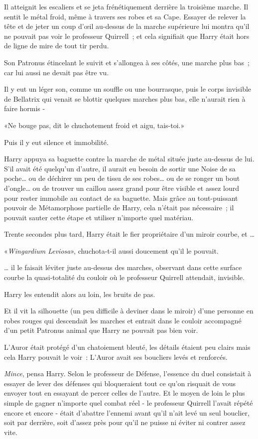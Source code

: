 Il atteignit les escaliers et se jeta frénétiquement derrière la troisième marche. Il sentit le métal froid, même à travers ses robes et sa Cape. Essayer de relever la tête et de jeter un coup d'œil au-dessus de la marche supérieure lui montra qu'il ne pouvait pas voir le professeur Quirrell~; et cela signifiait que Harry était hors de ligne de mire de tout tir perdu.

Son Patronus étincelant le suivit et s'allongea à ses côtés, une marche plus bas~; car lui aussi ne devait pas être vu.

Il y eut un léger son, comme un souffle ou une bourrasque, puis le corps invisible de Bellatrix qui venait se blottir quelques marches plus bas, elle n'aurait rien à faire hormis -

«Ne bouge pas, dit le chuchotement froid et aigu, tais-toi.»

Puis il y eut silence et immobilité.

Harry appuya sa baguette contre la marche de métal située juste au-dessus de lui. S'il avait été quelqu'un d'autre, il aurait eu besoin de sortir une Noise de sa poche… ou de déchirer un peu de tissu de ses robes… ou de se ronger un bout d'ongle… ou de trouver un caillou assez grand pour être visible et assez lourd pour rester immobile au contact de sa baguette. Mais grâce au tout-puissant pouvoir de Métamorphose partielle de Harry, cela n'était pas nécessaire~; il pouvait sauter cette étape et utiliser n'importe quel matériau.

Trente secondes plus tard, Harry était le fier propriétaire d'un miroir courbe, et …

«\emph{Wingardium Leviosa}», chuchota-t-il aussi doucement qu'il le pouvait.

… il le faisait léviter juste au-dessus des marches, observant dans cette surface courbe la quasi-totalité du couloir où le professeur Quirrell attendait, invisible.

Harry les entendit alors au loin, les bruits de pas.

Et il vit la silhouette (un peu difficile à deviner dans le miroir) d'une personne en robes rouges qui descendait les marches et entrait dans le couloir accompagné d'un petit Patronus animal que Harry ne pouvait pas bien voir.

L'Auror était protégé d'un chatoiement bleuté, les détails étaient peu clairs mais cela Harry pouvait le voir~: L'Auror avait ses boucliers levés et renforcés.

\emph{Mince}, pensa Harry. Selon le professeur de Défense, l'essence du duel consistait à essayer de lever des défenses qui bloqueraient tout ce qu'on risquait de vous envoyer tout en essayant de percer celles de l'autre. Et le moyen de loin le plus simple de gagner n'importe quel combat réel - le professeur Quirrell l'avait répété encore et encore - était d'abattre l'ennemi avant qu'il n'ait levé un seul bouclier, soit par derrière, soit d'assez près pour qu'il ne puisse ni éviter ni contrer assez vite.


